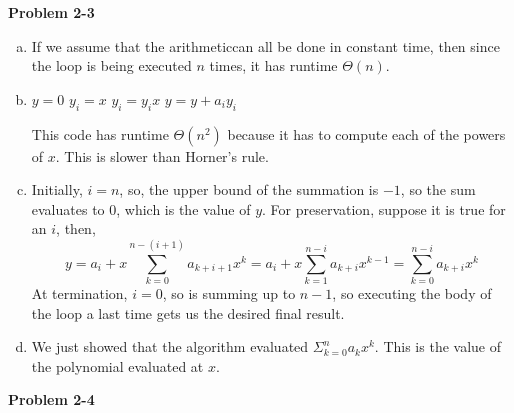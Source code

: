 \documentclass{article}
\begin{document}
\noindent\textbf{Problem 2-3}\\

\begin{enumerate}[a.]
\item

If we assume that the arithmeticcan all  be done in constant time, then since  the loop is being executed $n$ times, it has runtime $\Theta(n)$.

\item
\begin{algorithm}
\begin{algorithmic}[1]
\State $y=0$
\State $y_i = x$
\State $y_i = y_i  x$ 
\EndFor
\State $y = y+ a_i  y_i$
\EndFor
\end{algorithmic}
\end{algorithm}
This code has runtime $\Theta(n^2)$ because it has to compute each of the powers of $x$. This is slower than Horner's rule.

\item
Initially, $i=n$, so, the upper bound of the summation is $-1$, so the sum evaluates to $0$, which is the value of $y$. For preservation, suppose it is true for an $i$, then, 
\[
 y = a_{i} + x \sum_{k=0}^{n-(i+1)} a_{k+i+1} x^k = a_i + x\sum_{k=1}^{n-i} a_{k+i} x^{k-1} = \sum_{k=0}^{n-i} a_{k+i}x^k
 \]
  At termination, $i=0$, so is summing up to $n-1$, so executing the body of the loop a last time gets us  the desired final result.

\item
We just showed that the algorithm evaluated $\Sigma_{k=0}^n a_kx^k$. This is the value of the polynomial evaluated at $x$.

\end{enumerate}


\noindent\textbf{Problem 2-4}
\end{document}
